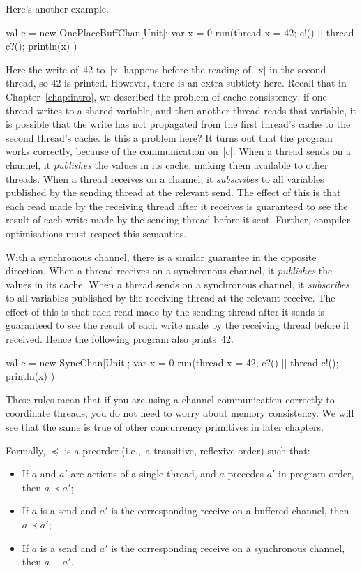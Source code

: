 Here's another example.
\begin{scala}
  val c = new OnePlaceBuffChan[Unit]; var x = 0
  run(thread{ x = 42; c!() } || thread{ c?(); println(x) })
\end{scala}
%
Here the write of~42 to~|x| happens before the reading of~|x| in the second
thread, so 42 is printed.  However, there is an extra subtlety here.  Recall
that in Chapter~\ref{chap:intro}, we described the problem of cache
consistency: if one thread writes to a shared
variable, and then another thread reads that variable, it is possible that the
write has not propagated from the first thread's cache to the second thread's
cache.  Is this a problem here?  It turns out that the program works
correctly, because of the communication on~|c|.  When a thread sends on a
channel, it \emph{publishes} the values in its cache, making
them available to other threads.  When a thread receives on a channel, it
\emph{subscribes} to all variables published by the sending
thread at the relevant send.  The effect of this is that each read made by the
receiving thread after it receives is guaranteed to see the result of each
write made by the sending thread before it sent.  Further, compiler
optimisations must respect this semantics.  

With a synchronous channel, there is a similar guarantee in the opposite
direction.  When a thread receives on a synchronous channel, it
\emph{publishes} the values in its cache.  When a thread sends
on a synchronous channel, it \emph{subscribes} to all
variables published by the receiving thread at the relevant receive.  The
effect of this is that each read made by the sending thread after it sends is
guaranteed to see the result of each write made by the receiving thread before
it received.  Hence the following program also prints~42.
%
\begin{scala}
  val c = new SyncChan[Unit]; var x = 0
  run(thread{ x = 42; c?() } || thread{ c!(); println(x) })
\end{scala}

These rules mean that if you are using a channel communication correctly to
coordinate threads, you do not need to worry about memory consistency.  We
will see that the same is true of other concurrency primitives in later
chapters. 
  
Formally, $\preceq$ is a preorder (i.e.,~a transitive, reflexive order) such
that:
%
\begin{itemize}
\item
If $a$ and $a'$ are actions of a single thread, and $a$ precedes $a'$ in
program order, then $a \prec a'$;

\item
If $a$ is a send and $a'$ is the corresponding receive on a buffered channel,
then $a \prec a'$;

\item
If $a$ is a send and $a'$ is the corresponding receive on a synchronous
channel, then $a \equiv a'$.
\end{itemize}

